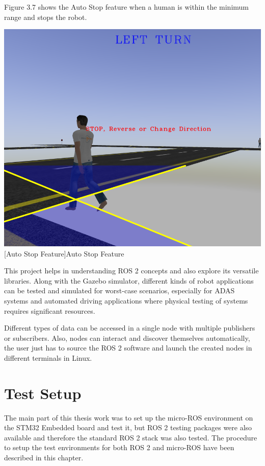 \documentclass[%
xelatex,
	oneside,		%
	12pt,			%
	parskip=half,	%
	abstracton,
	chapterprefix=true%
    appendixprefix=true]
{scrbook}
\begin{document}
Figure 3.7 shows the Auto Stop feature when a human is within the minimum range and stops the robot.
			\begin{center}
\includegraphics[scale=0.3]{fig/final2adas.png}
[Auto Stop Feature]{Auto Stop Feature}
\label{fig:lane1}
\end{center}
This project helps in understanding ROS 2 concepts and also explore its versatile libraries. Along with the Gazebo simulator, different kinds of robot applications can be tested and simulated for worst-case scenarios, especially for ADAS systems and automated driving applications where physical testing of systems requires significant resources. 

Different types of data can be accessed in a single node with multiple publishers or subscribers. Also, nodes can interact and discover themselves automatically, the user just has to source the ROS 2 software and launch the created nodes in different terminals in Linux.
	\chapter{Test Setup}
		
\rofoot[\pagemark]{\pagemark}
The main part of this thesis work was to set up the micro-ROS environment on the STM32 Embedded board and test it, but ROS 2 testing packages were also available and therefore the standard ROS 2 stack was also tested. The procedure to setup the test environments for both ROS 2 and micro-ROS have been described in this chapter.
	
\end{document}
